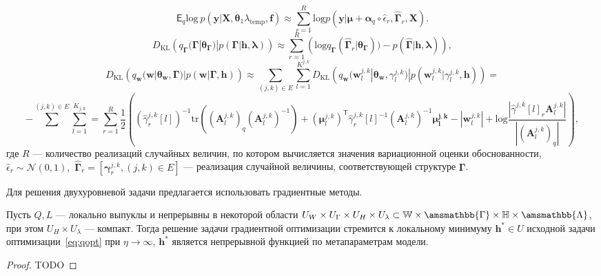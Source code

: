 \[
   \mathsf{E}_q \text{log}~p(\mathbf{y}|\mathbf{X}, \boldsymbol{\theta}_1 \lambda_{\text{temp}}, \mathbf{f}) \approx   \sum_{r=1}^R \text{log}p(\mathbf{y}|\boldsymbol{\mu}+\boldsymbol{\alpha}_q \circ \hat{\epsilon}_r, \hat{\boldsymbol{\Gamma}}_r, \mathbf{X}).
\]
\[
D_\text{KL}\left(q_{\boldsymbol{\Gamma}}(\boldsymbol{\Gamma}|\boldsymbol{\theta}_{\boldsymbol{\Gamma}})|p(\boldsymbol{\Gamma}|\mathbf{h}, \boldsymbol{\lambda})\right)   \approx  \sum_{r=1}^R \left(\text{log}q_{\boldsymbol{\Gamma}}(\hat{\boldsymbol{\Gamma}}_r|\boldsymbol{\theta}_{\boldsymbol{\Gamma}})) - p(\hat{\boldsymbol{\Gamma}}|\mathbf{h},\boldsymbol{\lambda})\right),
\]
\[
D_\text{KL}\left(q_{\mathbf{w}}(\mathbf{w}|\boldsymbol{\theta}_\mathbf{w},\boldsymbol{\Gamma})|p(\mathbf{w}|\boldsymbol{\Gamma}, \mathbf{h})\right)  \approx  \sum_{(j,k) \in E}\sum_{l=1}^{K^{j,k}} D_\text{KL}\left(q_{\mathbf{w}}(\mathbf{w}^{j,k}_l|\boldsymbol{\theta}_\mathbf{w},\gamma^{j,k}_l)|p(\mathbf{w}^{j,k}_l|\gamma^{j,k}_l, \mathbf{h})\right)=
\]
\[ 
-\sum^{(j,k) \in E}\sum_{l=1}^{K_{j,k}} = \sum_{r=1}^R\frac{1}{2}\left( \left(\hat{\gamma}^{j,k}_r[l]\right)^{-1}\text{tr}((\mathbf{A}^{j,k}_l)_q(\mathbf{A}^{j,k}_l)^{-1}) + (\boldsymbol{\mu}^{j,k}_l)^{\mathsf{T}}\hat{\gamma}^{j,k}_r[l]^{-1}(\mathbf{A}^{j,k}_l)^{-1}\boldsymbol{\mu^{j,k}_l} - |\mathbf{w}^{j,k}_l| + \text{log}\frac{|\hat{\gamma}^{j,k}[l]_r\mathbf{A}^{j,k}_l|}{|(\mathbf{A}^{j,k}_l)_q|}\right),
\]
где $R$ --- количество реализаций случайных величин, по котором вычисляется значения вариационной оценки обоснованности, $\hat{\epsilon}_r \sim \mathcal{N}(0,1),$
 $\hat{\boldsymbol{\Gamma}}_r = [\boldsymbol{\gamma}^{j,k}_r, (j,k) \in E]$ --- реализация случайной величины, соответствующей структуре $\boldsymbol{\Gamma}$.

Для решения двухуровневой задачи предлагается использовать градиентные методы. 
\begin{theorem}
Пусть $Q,L$ --- локально выпуклы и непрерывны в некоторой области $U_{W} \times U_{\Gamma} \times U_H \times U_\lambda \subset \mathbb{W}\times\amsmathbb{\Gamma}\times\mathbb{H}\times\amsmathbb{\Lambda}$, при  этом $U_H \times U_\lambda$ --- компакт. 
Тогда решение задачи градиентной оптимизации стремится к локальному минимуму  $\mathbf{h}^{*} \in U$ исходной задачи оптимизации~\eqref{eq:qopt} при $\eta \to \infty$,
$\mathbf{h}^{*}$ является непрерывной функцией по метапараметрам модели.
\end{theorem}

\begin{proof}
TODO
\end{proof}

